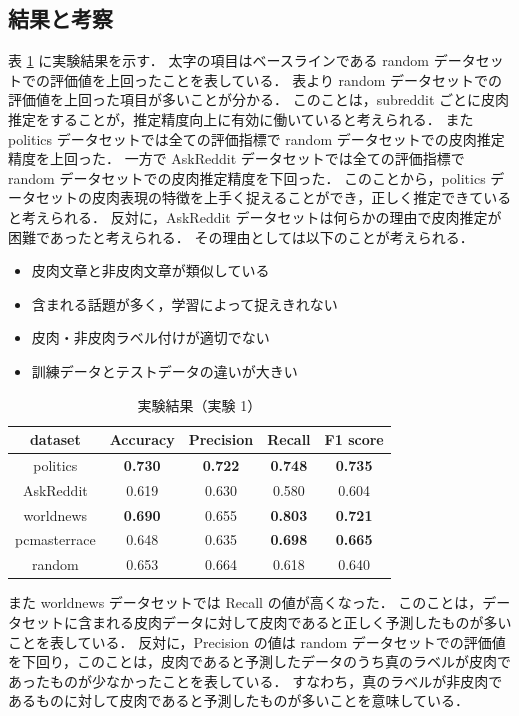 \subsection{結果と考察}
表 \ref{tb:4_bert_result} に実験結果を示す．
太字の項目はベースラインである random データセットでの評価値を上回ったことを表している．
表より random データセットでの評価値を上回った項目が多いことが分かる．
このことは，subreddit ごとに皮肉推定をすることが，推定精度向上に有効に働いていると考えられる．
また politics データセットでは全ての評価指標で random データセットでの皮肉推定精度を上回った．
一方で AskReddit データセットでは全ての評価指標で random データセットでの皮肉推定精度を下回った．
このことから，politics データセットの皮肉表現の特徴を上手く捉えることができ，正しく推定できていると考えられる．
反対に，AskReddit データセットは何らかの理由で皮肉推定が困難であったと考えられる．
その理由としては以下のことが考えられる．
\begin{itemize}
	\setlength{\itemsep}{-1mm}
\item 皮肉文章と非皮肉文章が類似している
\item 含まれる話題が多く，学習によって捉えきれない
\item 皮肉・非皮肉ラベル付けが適切でない
\item 訓練データとテストデータの違いが大きい
\end{itemize}


\begin{table}[tb]
  \caption{実験結果（実験 1） }
  \label{tb:4_bert_result}
  \centering
  \begin{tabular}{c c c c c} \hline

dataset & Accuracy & Precision & Recall & F1 score  \\ \hline
politics & \textbf{0.730} & \textbf{0.722} & \textbf{0.748} & \textbf{0.735} \\
AskReddit & 0.619 & 0.630 & 0.580 & 0.604 \\
worldnews & \textbf{0.690} & 0.655 & \textbf{0.803} & \textbf{0.721} \\
pcmasterrace & 0.648 & 0.635 & \textbf{0.698}  & \textbf{0.665} \\ \hline
random & 0.653 & 0.664 & 0.618 & 0.640 \\ \hline

  \end{tabular}
\end{table}


また worldnews データセットでは Recall の値が高くなった．
このことは，データセットに含まれる皮肉データに対して皮肉であると正しく予測したものが多いことを表している．
反対に，Precision の値は random データセットでの評価値を下回り，このことは，皮肉であると予測したデータのうち真のラベルが皮肉であったものが少なかったことを表している．
すなわち，真のラベルが非皮肉であるものに対して皮肉であると予測したものが多いことを意味している．




